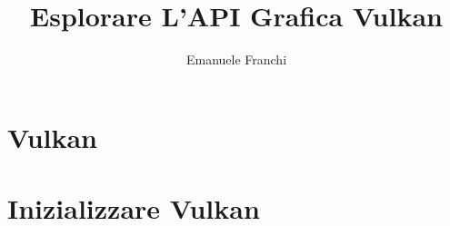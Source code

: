 \documentclass{beamer}
\title{Esplorare L'API Grafica Vulkan}
\author{Emanuele Franchi}
\date{}
\begin{document}


\section{Vulkan}





\section{Inizializzare Vulkan}





\end{document}
